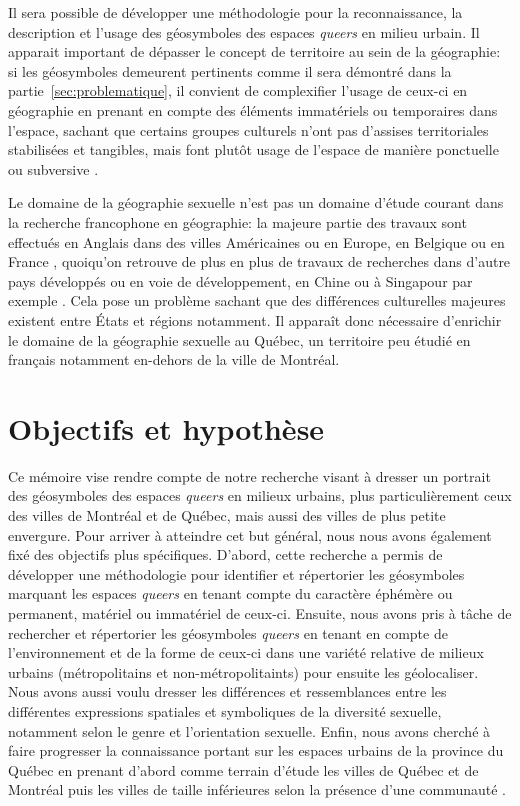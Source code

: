 Il sera possible de développer une méthodologie pour la reconnaissance, la description et l'usage des géosymboles des espaces \emph{queers} en milieu urbain.
Il apparait important de dépasser le concept de territoire au sein de la
géographie: si les géosymboles demeurent pertinents comme il sera démontré dans la partie~\ref{sec:problematique}, il convient de complexifier l'usage de ceux-ci en géographie en prenant en compte des éléments immatériels ou temporaires dans l'espace, sachant que certains groupes culturels n'ont pas d'assises territoriales stabilisées et tangibles, mais font plutôt usage de l'espace de manière ponctuelle ou subversive \parencite{Talburt2012}.

Le domaine de la géographie sexuelle n'est pas un domaine d'étude courant dans
la recherche francophone en géographie: la majeure partie des travaux sont effectués en Anglais dans des villes Américaines ou en Europe, en Belgique ou en France \parencite{Blidon2010,Blidon2006,Cattan2010,Deligne2006}, quoiqu'on retrouve de plus en plus de travaux de recherches dans d'autre pays développés ou en voie de développement, en Chine ou à Singapour par exemple \parencite{Oswin2014a,Kong2012}.
Cela pose un problème sachant que des différences culturelles majeures existent entre États et régions notamment. 
Il apparaît donc nécessaire d'enrichir le domaine de la géographie sexuelle au Québec, un territoire peu étudié en français notamment en-dehors de la ville de Montréal.


\section*{Objectifs et hypothèse}
Ce mémoire vise rendre compte de notre recherche visant à dresser un portrait des géosymboles des espaces \emph{queers} en milieux urbains, plus particulièrement ceux des villes de Montréal et de Québec, mais aussi des villes de plus petite envergure.
Pour arriver à atteindre cet but général, nous nous avons également fixé des objectifs plus spécifiques.
D'abord, cette recherche a permis de développer une méthodologie pour identifier et répertorier les géosymboles marquant les espaces \emph{queers} en tenant compte du caractère éphémère ou permanent, matériel ou immatériel de ceux-ci. 
Ensuite, nous avons pris à tâche de rechercher et répertorier les géosymboles \emph{queers} en tenant en compte de l'environnement et de la forme de ceux-ci dans une variété relative de milieux urbains (métropolitains et non-métropolitaints) pour ensuite les géolocaliser.
Nous avons aussi voulu dresser les différences et ressemblances entre les différentes expressions spatiales et symboliques de la diversité sexuelle, notamment selon le genre et l'orientation sexuelle.
Enfin, nous avons cherché à faire progresser la connaissance portant sur les espaces \lgbt{} urbains de la province du Québec en prenant d'abord comme terrain d'étude les villes de Québec et de Montréal puis les villes de taille inférieures selon la présence d'une communauté \lgbt{}.


